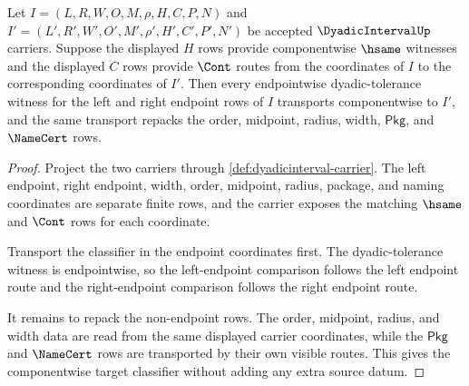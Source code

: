 \begin{theorem}
\label{thm:dyadicinterval-endpoint-classifier-transport}
Let $I=(L,R,W,O,M,\rho,H,C,P,N)$ and
$I'=(L',R',W',O',M',\rho',H',C',P',N')$ be accepted
$\DyadicIntervalUp$ carriers. Suppose the displayed $H$ rows provide
componentwise $\hsame$ witnesses and the displayed $C$ rows provide
$\Cont$ routes from the coordinates of $I$ to the corresponding coordinates
of $I'$. Then every endpointwise dyadic-tolerance witness for the left and
right endpoint rows of $I$ transports componentwise to $I'$, and the same
transport repacks the order, midpoint, radius, width, $\mathsf{Pkg}$, and
$\NameCert$ rows.
\end{theorem}
\begin{proof}
Project the two carriers through \autoref{def:dyadicinterval-carrier}. The
left endpoint, right endpoint, width, order, midpoint, radius, package, and
naming coordinates are separate finite rows, and the carrier exposes the
matching $\hsame$ and $\Cont$ rows for each coordinate.

Transport the classifier in the endpoint coordinates first. The
dyadic-tolerance witness is endpointwise, so the left-endpoint comparison
follows the left endpoint route and the right-endpoint comparison follows
the right endpoint route.

It remains to repack the non-endpoint rows. The order, midpoint, radius, and
width data are read from the same displayed carrier coordinates, while the
$\mathsf{Pkg}$ and $\NameCert$ rows are transported by their own visible
routes. This gives the componentwise target classifier without adding any
extra source datum.
\end{proof}

